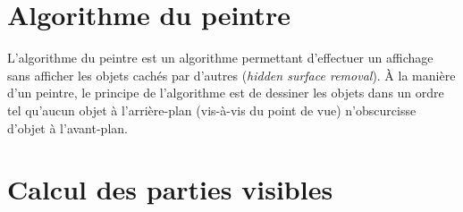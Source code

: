 \section{Algorithme du peintre}
L'algorithme du peintre est un algorithme permettant d'effectuer un
affichage sans afficher les objets cachés par d'autres (\emph{hidden surface
  removal}). \`{A} la manière d'un peintre, le principe de l'algorithme est
de dessiner les objets dans un ordre tel qu'aucun objet à l'arrière-plan
(vis-à-vis du point de vue) n'obscurcisse d'objet à l'avant-plan.
\section{Calcul des parties visibles}



